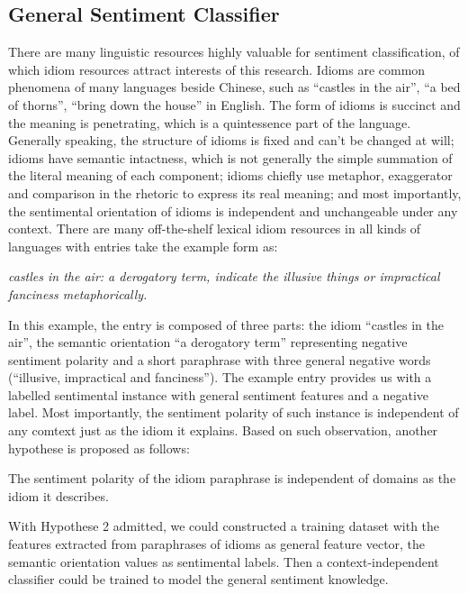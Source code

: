 \documentclass{llncs}
\begin{document}
\subsection{General Sentiment Classifier}
There are many linguistic resources highly valuable for sentiment classification, of which idiom resources attract interests of this research. 
Idioms are common phenomena of many languages beside Chinese, such as “castles in the air”, “a bed of thorns”, “bring down the house” in English.
The form of idioms is succinct and the meaning is penetrating, which is a quintessence part of the language. 
Generally speaking, the structure of idioms is fixed and can’t be changed at will; 
idioms have semantic intactness, which is not generally the simple summation of the literal meaning of each component;
idioms chiefly use metaphor, exaggerator and comparison in the rhetoric to express its real meaning;
and most importantly, the sentimental orientation of idioms is independent and unchangeable under any context. 
There are many off-the-shelf lexical idiom resources in all kinds of languages with entries take the example form as:

\textit{castles in the air: a derogatory term, indicate the illusive things or impractical fanciness metaphorically.}

In this example, the entry is composed of three parts: the idiom “castles in the air”, the semantic orientation “a derogatory term” representing negative
sentiment polarity and a short paraphrase with three general negative words (“illusive, impractical and fanciness”). 
The example entry provides us with a labelled sentimental instance with general sentiment features and a negative label.
Most importantly, the sentiment polarity of such instance is independent of any comtext just as the idiom it explains. 
Based on such observation, another hypothese is proposed as follows:
\begin{hypothesis}
The sentiment polarity of the idiom paraphrase is independent of domains as the idiom it
describes.
\end{hypothesis}
With Hypothese 2 admitted, we could constructed a training dataset with the features extracted from paraphrases of idioms as general feature vector, the semantic orientation values as sentimental labels. 
Then a context-independent classifier could be trained to model the general sentiment knowledge.
\end{document}
